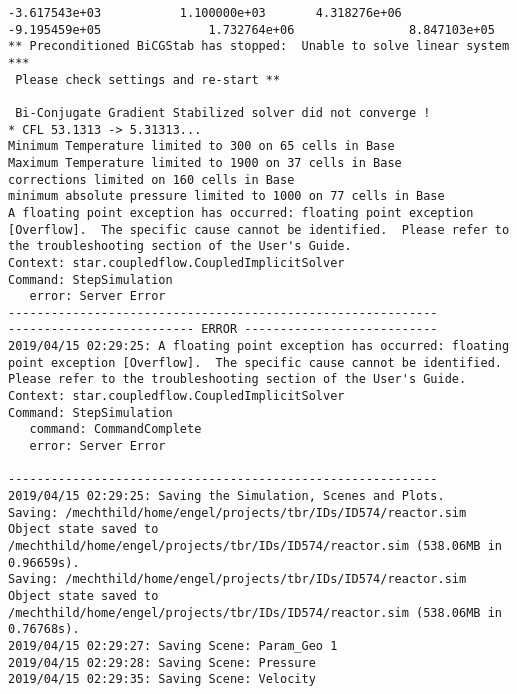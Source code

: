 \documentclass{article}
\begin{document}
{\begin{verbatim}
-3.617543e+03           1.100000e+03       4.318276e+06                         -9.195459e+05               1.732764e+06                8.847103e+05 
** Preconditioned BiCGStab has stopped:  Unable to solve linear system *** 
 Please check settings and re-start ** 

 Bi-Conjugate Gradient Stabilized solver did not converge !
* CFL 53.1313 -> 5.31313...
Minimum Temperature limited to 300 on 65 cells in Base
Maximum Temperature limited to 1900 on 37 cells in Base
corrections limited on 160 cells in Base
minimum absolute pressure limited to 1000 on 77 cells in Base
A floating point exception has occurred: floating point exception [Overflow].  The specific cause cannot be identified.  Please refer to the troubleshooting section of the User's Guide.
Context: star.coupledflow.CoupledImplicitSolver
Command: StepSimulation
   error: Server Error
------------------------------------------------------------
-------------------------- ERROR ---------------------------
2019/04/15 02:29:25: A floating point exception has occurred: floating point exception [Overflow].  The specific cause cannot be identified.  Please refer to the troubleshooting section of the User's Guide.
Context: star.coupledflow.CoupledImplicitSolver
Command: StepSimulation
   command: CommandComplete
   error: Server Error

------------------------------------------------------------
2019/04/15 02:29:25: Saving the Simulation, Scenes and Plots.
Saving: /mechthild/home/engel/projects/tbr/IDs/ID574/reactor.sim
Object state saved to /mechthild/home/engel/projects/tbr/IDs/ID574/reactor.sim (538.06MB in 0.96659s).
Saving: /mechthild/home/engel/projects/tbr/IDs/ID574/reactor.sim
Object state saved to /mechthild/home/engel/projects/tbr/IDs/ID574/reactor.sim (538.06MB in 0.76768s).
2019/04/15 02:29:27: Saving Scene: Param_Geo 1
2019/04/15 02:29:28: Saving Scene: Pressure
2019/04/15 02:29:35: Saving Scene: Velocity
\end{verbatim}
}
\clearpage
\end{document}
